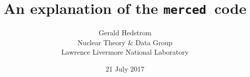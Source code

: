 \documentclass[11pt]{report}
\newcommand{\gettransfer}{\texttt{merced}}
\begin{document}
\title{An explanation of the \gettransfer\ code}
\author{Gerald Hedstrom\\
  Nuclear Theory \& Data Group\\
  Lawrence Livermore National Laboratory}
\date{21 July 2017}
\maketitle

\tableofcontents













\appendix


\end{document}
